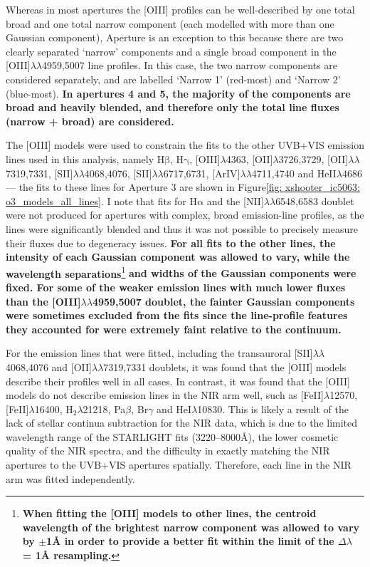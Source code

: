 Whereas in most apertures the [OIII] profiles can be well-described by one total broad and one total narrow component (each modelled with more than one Gaussian component), Aperture is an exception to this because there are two clearly separated `narrow' components and a single broad component in the [OIII]$\lambda\lambda$4959,5007 line profiles. In this case, the two narrow components are considered separately, and are labelled `Narrow 1' (red-most) and `Narrow 2' (blue-most). \textbf{In apertures 4 and 5, the majority of the components are broad and heavily blended, and therefore only the total line fluxes (narrow + broad) are considered.}

The [OIII] models were used to constrain the fits to the other UVB+VIS emission lines used in this analysis, namely H$\mathrm{\beta}$, H$\mathrm{\gamma}$, [OIII]$\lambda$4363, [OII]$\lambda$3726,3729, [OII]$\lambda\lambda$7319,7331, [SII]$\lambda\lambda$4068,4076, [SII]$\lambda\lambda$6717,6731, [ArIV]$\lambda\lambda$4711,4740 and HeII$\lambda$4686 --- the fits to these lines for Aperture 3 are shown in Figure\;\ref{fig: xshooter_ic5063: o3_models_all_lines}. I note that fits for H$\mathrm{\alpha}$ and the [NII]$\lambda\lambda$6548,6583 doublet were not produced for apertures with complex, broad emission-line profiles, as the lines were significantly blended and thus it was not possible to precisely measure their fluxes due to degeneracy issues. \textbf{For all fits to the other lines, the intensity of each Gaussian component was allowed to vary, while the wavelength separations}\footnote{\textbf{When fitting the [OIII] models to other lines, the centroid wavelength of the brightest narrow component was allowed to vary by $\pm$1{\;\AA} in order to provide a better fit within the limit of the $\Delta\lambda$ = 1{\;\AA} resampling.}} \textbf{and widths of the Gaussian components were fixed. For some of the weaker emission lines with much lower fluxes than the [OIII]$\lambda\lambda$4959,5007 doublet, the fainter Gaussian components were sometimes excluded from the fits since the line-profile features they accounted for were extremely faint relative to the continuum.}

For the emission lines that were fitted, including the transauroral [SII]$\lambda\lambda$4068,4076 and [OII]$\lambda\lambda$7319,7331 doublets, it was found that the [OIII] models describe their profiles well in all cases. In contrast, it was found that the [OIII] models do not describe emission lines in the NIR arm well, such as [FeII]$\lambda$12570, [FeII]$\lambda$16400, H$_2 \lambda$21218, Pa$\beta$, Br$\gamma$ and HeI$\lambda$10830. This is likely a result of the lack of stellar continua subtraction for the NIR data, which is due to the limited wavelength range of the \textsc{STARLIGHT} fits (3220--8000\;\AA), the lower cosmetic quality of the NIR spectra, and the difficulty in exactly matching the NIR apertures to the UVB+VIS apertures spatially. Therefore, each line in the NIR arm was fitted independently. \\


